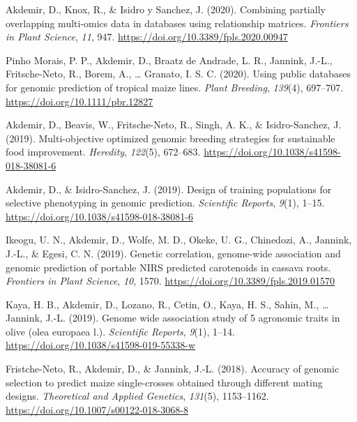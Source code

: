 \documentclass[11pt,a4paper,]{moderncv}
\newlength{\cslhangindent}
\newenvironment{CSLReferences}[2] %
 {\begin{list}{}{%
  \setlength{\itemindent}{0pt}
  \setlength{\leftmargin}{0pt}
  \setlength{\parsep}{0pt}
  \ifodd #1
   \setlength{\leftmargin}{\cslhangindent}
   \setlength{\itemindent}{-1\cslhangindent}
  \fi
  \setlength{\itemsep}{#2\baselineskip}}}
 {\end{list}}
\begin{document}
\begin{CSLReferences}{1}{0}
Akdemir, D., Knox, R., \& Isidro y Sanchez, J. (2020). Combining
partially overlapping multi-omics data in databases using relationship
matrices. \emph{Frontiers in Plant Science}, \emph{11}, 947.
\url{https://doi.org/10.3389/fpls.2020.00947}

Pinho Morais, P. P., Akdemir, D., Braatz de Andrade, L. R., Jannink,
J.-L., Fritsche-Neto, R., Borem, A., \ldots{} Granato, I. S. C. (2020).
Using public databases for genomic prediction of tropical maize lines.
\emph{Plant Breeding}, \emph{139}(4), 697--707.
\url{https://doi.org/10.1111/pbr.12827}

Akdemir, D., Beavis, W., Fritsche-Neto, R., Singh, A. K., \&
Isidro-Sanchez, J. (2019). Multi-objective optimized genomic breeding
strategies for sustainable food improvement. \emph{Heredity},
\emph{122}(5), 672--683.
\url{https://doi.org/10.1038/s41598-018-38081-6}

Akdemir, D., \& Isidro-Sanchez, J. (2019). Design of training
populations for selective phenotyping in genomic prediction.
\emph{Scientific Reports}, \emph{9}(1), 1--15.
\url{https://doi.org/10.1038/s41598-018-38081-6}

Ikeogu, U. N., Akdemir, D., Wolfe, M. D., Okeke, U. G., Chinedozi, A.,
Jannink, J.-L., \& Egesi, C. N. (2019). Genetic correlation, genome-wide
association and genomic prediction of portable NIRS predicted
carotenoids in cassava roots. \emph{Frontiers in Plant Science},
\emph{10}, 1570. \url{https://doi.org/10.3389/fpls.2019.01570}

Kaya, H. B., Akdemir, D., Lozano, R., Cetin, O., Kaya, H. S., Sahin, M.,
\ldots{} Jannink, J.-L. (2019). Genome wide association study of 5
agronomic traits in olive (olea europaea l.). \emph{Scientific Reports},
\emph{9}(1), 1--14. \url{https://doi.org/10.1038/s41598-019-55338-w}

Fristche-Neto, R., Akdemir, D., \& Jannink, J.-L. (2018). Accuracy of
genomic selection to predict maize single-crosses obtained through
different mating designs. \emph{Theoretical and Applied Genetics},
\emph{131}(5), 1153--1162.
\url{https://doi.org/10.1007/s00122-018-3068-8}


\end{CSLReferences}
\end{document}

